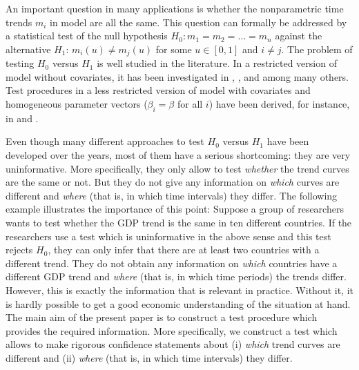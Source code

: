 \documentclass[12pt]{article}
\makeatletter
\renewcommand{\eqref}[1]{\tagform@{\ref{#1}}}
\makeatother
\begin{document}
An important question in many applications is whether the nonparametric time trends $m_i$ in model \eqref{eq:model} are all the same. This question can formally be addressed by a statistical test of the null hypothesis 
$H_0: m_1 = m_2 = \ldots = m_n$
against the alternative $H_1$: $m_i (u) \neq m_j(u)$ for some $u \in [0,1]$ and $i \ne j$. The problem of testing $H_0$ versus $H_1$ is well studied in the literature. In a restricted version of model \eqref{eq:model} without covariates, it has been investigated in \cite{HaerdleMarron1990}, \cite{Hall1990}, \cite{DegrasWu2012} and \cite{ChenWu2018} among many others. Test procedures in a less restricted version of model \eqref{eq:model} with covariates and homogeneous parameter vectors ($\beta_i = \beta$ for all $i$) have been derived, for instance, in \cite{Zhang2012} and \cite{Hidalgo2014}.


Even though many different approaches to test $H_0$ versus $H_1$ have been developed over the years, most of them have a serious shortcoming: they are very uninformative. More specifically, they only allow to test \textit{whether} the trend curves are the same or not. But they do not give any information on \textit{which} curves are different and \textit{where} (that is, in which time intervals) they differ. The following example illustrates the importance of this point: Suppose a group of researchers wants to test whether the GDP trend is the same in ten different countries. If the researchers use a test which is uninformative in the above sense and this test rejects $H_0$, they can only infer that there are at least two countries with a different trend. They do not obtain any information on \textit{which} countries have a different GDP trend and \textit{where} (that is, in which time periods) the trends differ. However, this is exactly the information that is relevant in practice. Without it, it is hardly possible to get a good economic understanding of the situation at hand. The main aim of the present paper is to construct a test procedure which provides the required information. More specifically, we construct a test which allows to make rigorous confidence statements about (i) \textit{which} trend curves are different and (ii) \textit{where} (that is, in which time intervals) they differ. 
\end{document}

